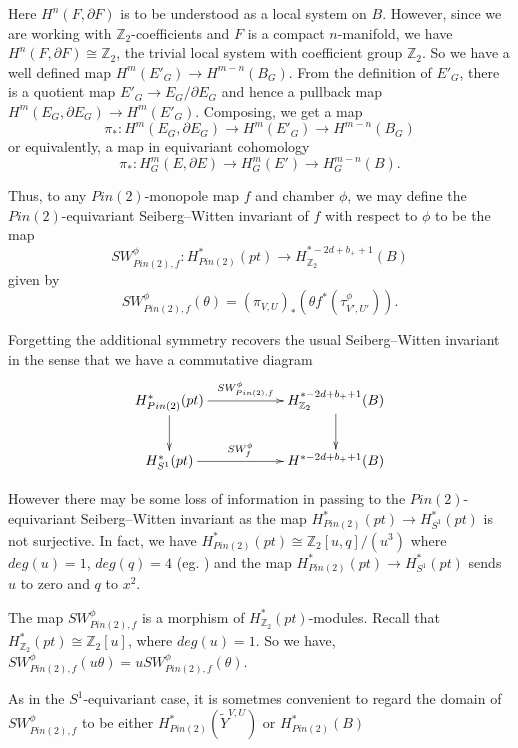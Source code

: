 \documentclass{amsart}
\theoremstyle{definition}
\theoremstyle{remark}
\numberwithin{equation}{section}
\begin{document}
Here $H^n(F , \partial F)$ is to be understood as a local system on $B$. However, since we are working with $\mathbb{Z}_2$-coefficients and $F$ is a compact $n$-manifold, we have $H^n(F , \partial F) \cong \mathbb{Z}_2$, the trivial local system with coefficient group $\mathbb{Z}_2$. So we have a well defined map $H^m( E'_G) \to H^{m-n}(B_G)$. From the definition of $E'_G$, there is a quotient map $E'_G \to E_G/\partial E_G$ and hence a pullback map $H^m( E_G , \partial E_G) \to H^m(E'_G)$. Composing, we get a map
\[
\pi_* : H^m( E_G , \partial E_G) \to H^m(E'_G) \to H^{m-n}( B_G)
\]
or equivalently, a map in equivariant cohomology
\[
\pi_* : H^m_G( E , \partial E) \to H^m_G(E') \to H^{m-n}_G(B).
\]

Thus, to any $Pin(2)$-monopole map $f$ and chamber $\phi$, we may define the {$Pin(2)$-equivariant Seiberg--Witten invariant of $f$ with respect to $\phi$} to be the map
\[
SW^\phi_{Pin(2) , f} : H^*_{Pin(2)}(pt) \to H^{*-2d+b_++1}_{\mathbb{Z}_2}(B)
\]
given by
\[
SW^\phi_{Pin(2), f}(\theta) = (\pi_{V,U})_*( \theta  f^*(\tau^\phi_{V',U'})).
\]

Forgetting the additional symmetry recovers the usual Seiberg--Witten invariant in the sense that we have a commutative diagram
\begin{equation}\label{equ:cd1}
\xymatrix{
H^*_{Pin(2)}(pt) \ar[rr]^-{SW^\phi_{Pin(2),f}} \ar[d] & & H^{*-2d+b_++1}_{\mathbb{Z}_2}(B) \ar[d] \\
H^*_{S^1}(pt) \ar[rr]^-{SW^\phi_f} & & H^{*-2d+b_++1}(B) \\
}
\end{equation}

However there may be some loss of information in passing to the $Pin(2)$-equivariant Seiberg--Witten invariant as the map $H^*_{Pin(2)}(pt) \to H^*_{S^1}(pt)$ is not surjective. In fact, we have $H^*_{Pin(2)}(pt) \cong \mathbb{Z}_2[u,q]/(u^3)$ where $deg(u)=1$, $deg(q) = 4$ (eg. \cite[]{bar}) and the map $H^*_{Pin(2)}(pt) \to H^*_{S^1}(pt)$ sends $u$ to zero and $q$ to $x^2$.

The map $SW_{Pin(2),f}^{\phi}$ is a morphism of $H^*_{\mathbb{Z}_2}(pt)$-modules. Recall that $H^*_{\mathbb{Z}_2}(pt) \cong \mathbb{Z}_2[u]$, where $deg(u) = 1$. So we have, $SW_{Pin(2),f}^{\phi}(u\theta) = uSW_{Pin(2),f}^{\phi}(\theta)$.

As in the $S^1$-equivariant case, it is sometmes convenient to regard the domain of $SW^\phi_{Pin(2),f}$ to be either $H^*_{Pin(2)}( \widetilde{Y}^{V,U})$ or $H^*_{Pin(2)}(B)$ 
\end{document}
